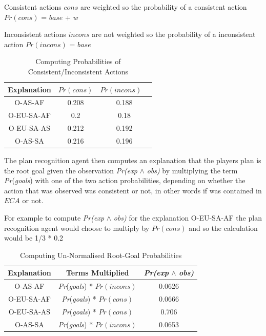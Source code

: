\documentclass[parskip]{cs4rep}
\begin{document}
Consistent actions $cons$ are weighted so the probability of a consistent action $Pr(cons)$ = $base$ + $w$

Inconsistent actions $incons$ are not weighted so the probability of a inconsistent action $Pr(incons)$ = $base$

\begin{table}[ht]
\centering
\begin{tabular}{|c|c|c|}
\hline 
\textbf{Explanation} & $Pr(cons)$ & $Pr(incons)$ \ \\ 
\hline 
O-AS-AF & 0.208 & 0.188 \\ 
\hline 
O-EU-SA-AF & 0.2 & 0.18 \\ 
\hline 
O-EU-SA-AS & 0.212 & 0.192 \\ 
\hline 
O-AS-SA & 0.216 & 0.196 \\ 
\hline 
\end{tabular}
\caption{Computing Probabilities of Consistent/Inconsistent Actions}
\label{table:territory-actions-bonus}
\end{table}

The plan recognition agent then computes an explanation that the players plan is the root goal given the observation \textit{Pr(exp} $\wedge$ \textit{obs)} by multiplying the term  \textit{Pr}(\textit{goals}) with one of the two action probabilities, depending on whether the action that was observed was consistent or not, in other words if was contained in $ECA$ or not.

For example to compute \textit{Pr(exp} $\wedge$ \textit{obs)} for the explanation O-EU-SA-AF the plan recognition agent would choose to multiply by $Pr(cons)$ and so the calculation would be 1/3 * 0.2 

\begin{table}[ht]
\centering
\begin{tabular}{|c|c|c|}
\hline 
\textbf{Explanation} & \textbf{Terms Multiplied} &\textit{Pr(exp} $\wedge$ \textit{obs)} \\ 
\hline 
O-AS-AF & \textit{Pr}(\textit{goals}) * $Pr(incons)$ & 0.0626 \\ 
\hline 
O-EU-SA-AF & \textit{Pr}(\textit{goals}) * $Pr(cons)$ & 0.0666 \\ 
\hline 
O-EU-SA-AS & \textit{Pr}(\textit{goals}) * $Pr(cons)$ & 0.706 \\ 
\hline 
O-AS-SA & \textit{Pr}(\textit{goals}) * $Pr(incons)$ & 0.0653 \\ 
\hline 
\end{tabular}
\caption{Computing Un-Normalised Root-Goal Probabilities}
\label{table:territory-actions-bonus}
\end{table}
\end{document}

